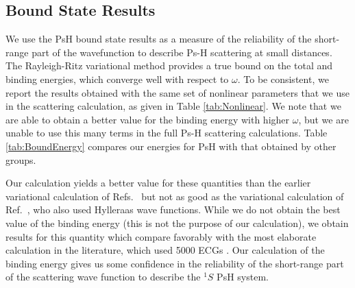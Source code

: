 \documentclass[preprint,showpacs,showkeys,preprintnumbers,amsmath,amssymb,longbibliography,pra,aps]{revtex4-1}
\begin{document}
\subsection{Bound State Results}

We use the PsH bound state results as a measure of the reliability of the 
short-range part of the wavefunction to describe Ps-H scattering at small 
distances. The Rayleigh-Ritz variational method provides a true bound on the 
total and binding energies, which converge well with respect to $\omega$. To 
be consistent, we report the results obtained with the same set of nonlinear 
parameters that we use in the scattering calculation, as given in
Table \ref{tab:Nonlinear}. We note that we are able to obtain a better value for
the binding energy with higher $\omega$, but we are unable to use this many
terms in the full Ps-H scattering calculations. Table \ref{tab:BoundEnergy} 
compares our energies for PsH with that obtained by other groups.

Our calculation yields a better value for these quantities than the earlier 
variational calculation of Refs.~\cite{VanReeth2003,VanReeth2004} but not
as good as the variational calculation of Ref.~\cite{Yan1999}, who also
used Hylleraas wave functions. While we do not obtain the best value of the 
binding energy (this is not the purpose of our calculation), we obtain 
results for this quantity which compare favorably with the most elaborate 
calculation in the literature, which used 5000 ECGs \cite{Bubin2006}. Our 
calculation of the binding energy gives us some confidence in the reliability 
of the short-range part of the scattering wave function to describe the $^1S$ 
PsH system.
\end{document}
